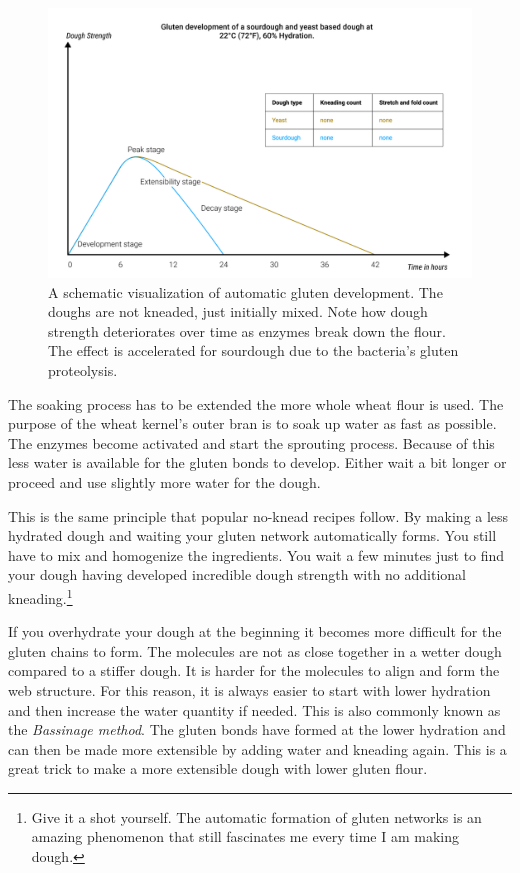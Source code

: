 \begin{figure}[!htb]
  \includegraphics[width=\textwidth]{dough-strength-sourdough-yeast}
  \caption{A schematic visualization of
  automatic gluten development. The doughs are not kneaded, just initially
  mixed. Note how dough strength
  deteriorates over time as enzymes break down the flour. The effect
  is accelerated for sourdough due to the bacteria's gluten proteolysis.
  }
  \label{fig:wheat-yeast-sourdough-degradation}
\end{figure}

The soaking process has to be extended the more whole wheat flour is used.
The purpose of the wheat kernel's outer bran is to soak up water as fast
as possible. The enzymes become activated and start the sprouting process.
Because of this less water is available for the gluten bonds to develop.
Either wait a bit longer or proceed and use slightly more water for
the dough.

This is the same principle that popular no-knead recipes follow. By making a less
hydrated dough and waiting your gluten network automatically forms. You still
have to mix and homogenize the ingredients. You wait a few minutes just to
find your dough having developed incredible dough strength with no additional
kneading.\footnote{Give it a shot yourself. The automatic formation of gluten
networks is an amazing phenomenon that still fascinates me every time I am
making dough.}

If you overhydrate your dough at the beginning it becomes more difficult
for the gluten chains to form. The molecules are not as close together in
a wetter dough compared to a stiffer dough. It is harder for the molecules
to align and form the web structure. For this reason, it is always easier
to start with lower hydration and then increase the water quantity if needed.
This is also commonly known as the \textit{Bassinage method}. The gluten
bonds have formed at the lower hydration and can then be made more extensible
by adding water and kneading again. This is a great trick to make
a more extensible dough with lower gluten flour. \cite{bassinage+technique}

